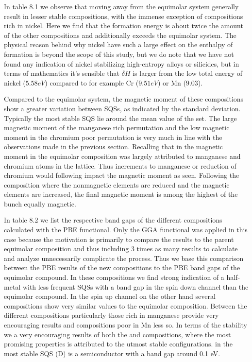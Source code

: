 In table 8.1 we observe that moving away from the equimolar system generally result in lesser stable compositions, with the immense exception of compositions rich in nickel. Here we find that the formation energy is about twice the amount of the other compositions and additionally exceeds the equimolar system. The physical reason behind why nickel have such a large effect on the enthalpy of formation is beyond the scope of this study, but we do note that we have not found any indication of nickel stabilizing high-entropy alloys or silicides, but in terms of mathematics it's sensible that $\delta H$ is larger from the low total energy of nickel ($5.58 eV$) compared to for example Cr ($9.51 eV$) or Mn ($9.03$). 

  
Compared to the equimolar system, the magnetic moment of these compositions show a greater variation between SQSs, as indicated by the standard deviation. Typically the most stable SQS lie around the mean value of the set. The large magnetic moment of the manganese rich permutation and the low magnetic moment in the chromium poor permutation is very much in line with the observations made in the previous section. Recalling that in the magnetic moment in the equimolar composition was largely attributed to manganese and chromium atoms in the lattice. Thus increments to manganese or reduction of chromium would following impact the magnetic moment as seen. Following the composition  where the nonmagnetic elements are reduced and the magnetic elements are increased, the final magnetic moment is among the highest of the bunch equally magnetic. 

In table 8.2 we list the respective band gaps of the different compositions calculated with the PBE functional. Only the GGA functional was applied in this case because the motivation is primarily to compare the results to the parent equimolar composition and thus including 3 times as many results to calculate and analyze unnecessarily complicate the process. Thus we base this comparison between the PBE results of the new compositions to the PBE band gaps of the equimolar compound. In these compositions we find strong indication of a half-metal with less frequent SQSs with a band gap in the spin down channel than the equimolar compound. In the spin up channel on the other hand several compositions show very similar values to the equimolar composition. Between the different compositions particularly those rich in manganese provide very encouraging results and compositions poor in Mn less so. In terms of the stability we a very encouraging results of both the  and  compositions, where the most promising properties is attributed to the utmost stable configurations.  in  the most stable SQS (D) is a semiconductor with a band gap around 0.1 eV.

